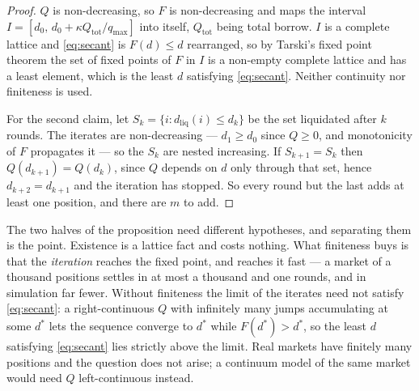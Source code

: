 \documentclass[11pt,a4paper]{article}
\theoremstyle{plain}
\theoremstyle{definition}
\theoremstyle{remark}
\begin{document}
\begin{proof}
$Q$ is non-decreasing, so $F$ is non-decreasing and maps the interval
$I=[d_0,\,d_0+\kappa Q_{\mathrm{tot}}/q_{\max}]$ into itself, $Q_{\mathrm{tot}}$ being total borrow.
$I$ is a complete lattice and \eqref{eq:secant} is $F(d)\leq d$ rearranged, so by Tarski's fixed
point theorem the set of fixed points of $F$ in $I$ is a non-empty complete lattice and has a least
element, which is the least $d$ satisfying \eqref{eq:secant}. Neither continuity nor finiteness is
used.

For the second claim, let $S_k=\{i : d_{\mathrm{liq}}(i)\leq d_k\}$ be the set liquidated after $k$
rounds. The iterates are non-decreasing --- $d_1\geq d_0$ since $Q\geq0$, and monotonicity of $F$
propagates it --- so the $S_k$ are nested increasing. If $S_{k+1}=S_k$ then $Q(d_{k+1})=Q(d_k)$,
since $Q$ depends on $d$ only through that set, hence $d_{k+2}=d_{k+1}$ and the iteration has
stopped. So every round but the last adds at least one position, and there are $m$ to add.
\end{proof}

The two halves of the proposition need different hypotheses, and separating them is the point.
Existence is a lattice fact and costs nothing. What finiteness buys is that the \emph{iteration}
reaches the fixed point, and reaches it fast --- a market of a thousand positions settles in at
most a thousand and one rounds, and in simulation far fewer. Without finiteness the limit of the
iterates need not satisfy
\eqref{eq:secant}: a right-continuous $Q$ with infinitely many jumps accumulating at some $d^{*}$
lets the sequence converge to $d^{*}$ while $F(d^{*})>d^{*}$, so the least $d$ satisfying
\eqref{eq:secant} lies strictly above the limit. Real markets have finitely many positions and the
question does not arise; a continuum model of the same market would need $Q$ left-continuous
instead.
\end{document}
